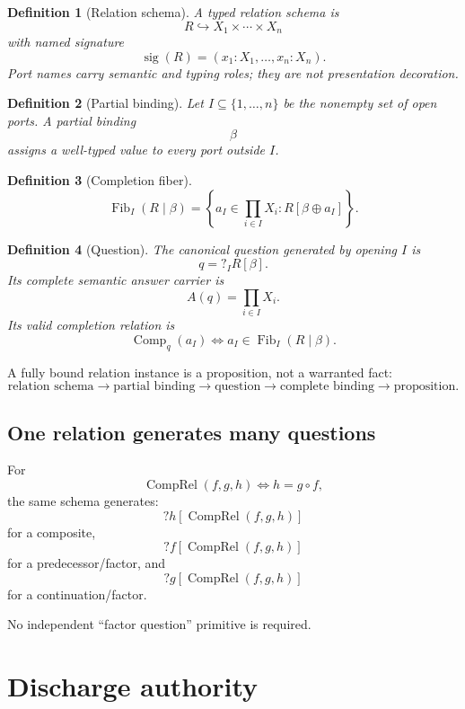 \documentclass[11pt,oneside]{article}
\newtheorem{definition}{Definition}[section]
\newcommand{\Fib}{\operatorname{Fib}}
\newcommand{\Comp}{\operatorname{Comp}}
\begin{document}
\begin{definition}[Relation schema]
A typed relation schema is
\[
R\hookrightarrow X_1\times\cdots\times X_n
\]
with named signature
\[
\operatorname{sig}(R)
=
(x_1:X_1,\ldots,x_n:X_n).
\]
Port names carry semantic and typing roles; they are not presentation decoration.
\end{definition}

\begin{definition}[Partial binding]
Let \(I\subseteq\{1,\ldots,n\}\) be the nonempty set of open ports.  A partial binding
\[
\beta
\]
assigns a well-typed value to every port outside \(I\).
\end{definition}

\begin{definition}[Completion fiber]
\[
\boxed{
\Fib_I(R\mid\beta)
=
\left\{
a_I\in\prod_{i\in I}X_i:
R[\beta\oplus a_I]
\right\}.
}
\]
\end{definition}

\begin{definition}[Question]
The canonical question generated by opening \(I\) is
\[
\boxed{
q=?_I R[\beta].
}
\]
Its complete semantic answer carrier is
\[
A(q)=\prod_{i\in I}X_i.
\]
Its valid completion relation is
\[
\Comp_q(a_I)\iff a_I\in\Fib_I(R\mid\beta).
\]
\end{definition}

A fully bound relation instance is a proposition, not a warranted fact:
\[
\boxed{
\text{relation schema}
\to
\text{partial binding}
\to
\text{question}
\to
\text{complete binding}
\to
\text{proposition}.
}
\]

\subsection{One relation generates many questions}

For
\[
\operatorname{CompRel}(f,g,h)\iff h=g\circ f,
\]
the same schema generates:
\[
?h[\operatorname{CompRel}(f,g,h)]
\]
for a composite,
\[
?f[\operatorname{CompRel}(f,g,h)]
\]
for a predecessor/factor, and
\[
?g[\operatorname{CompRel}(f,g,h)]
\]
for a continuation/factor.

No independent ``factor question'' primitive is required.

\section{Discharge authority}
\end{document}
